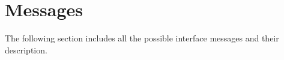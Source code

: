 \chapter{Messages}

The following section includes all the possible interface messages and their description.



\newpage